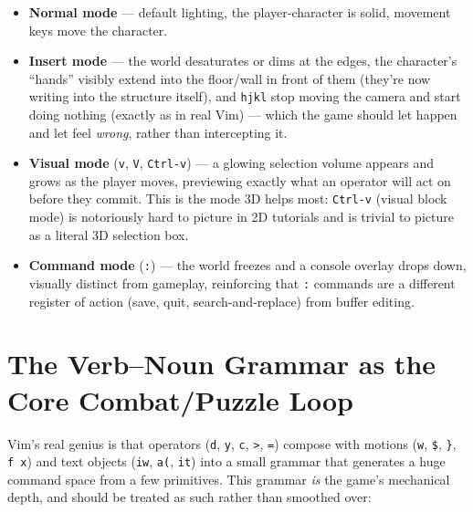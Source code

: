 \documentclass[11pt]{article}
\providecommand{\tightlist}{%
  \setlength{\itemsep}{0pt}\setlength{\parskip}{0pt}}
\begin{document}
\begin{itemize}
\tightlist
\item
  \textbf{Normal mode} --- default lighting, the player-character is solid, movement
  keys move the character.
\item
  \textbf{Insert mode} --- the world desaturates or dims at the edges, the
  character's ``hands'' visibly extend into the floor/wall in front of them
  (they're now writing into the structure itself), and \texttt{hjkl} stop moving the
  camera and start doing nothing (exactly as in real Vim) --- which the game
  should let happen and let feel \emph{wrong}, rather than intercepting it.
\item
  \textbf{Visual mode} (\texttt{v}, \texttt{V}, \texttt{Ctrl-v}) --- a glowing selection volume appears and
  grows as the player moves, previewing exactly what an operator will act on
  before they commit. This is the mode 3D helps most: \texttt{Ctrl-v} (visual block
  mode) is notoriously hard to picture in 2D tutorials and is trivial to
  picture as a literal 3D selection box.
\item
  \textbf{Command mode} (\texttt{:}) --- the world freezes and a console overlay drops down,
  visually distinct from gameplay, reinforcing that \texttt{:} commands are a
  different register of action (save, quit, search-and-replace) from
  buffer editing.
\end{itemize}

\hypertarget{sec-the-verb-noun-grammar-as-the-core-combat-puzzle-loop}{%
\section{The Verb--Noun Grammar as the Core Combat/Puzzle Loop}\label{sec-the-verb-noun-grammar-as-the-core-combat-puzzle-loop}}

Vim's real genius is that operators (\texttt{d}, \texttt{y}, \texttt{c}, \texttt{\textgreater{}}, \texttt{=}) compose with
motions (\texttt{w}, \texttt{\$}, \texttt{\}}, \texttt{f\ x}) and text objects (\texttt{iw}, \texttt{a(}, \texttt{it}) into a small
grammar that generates a huge command space from a few primitives. This
grammar \emph{is} the game's mechanical depth, and should be treated as such rather
than smoothed over:
\end{document}
